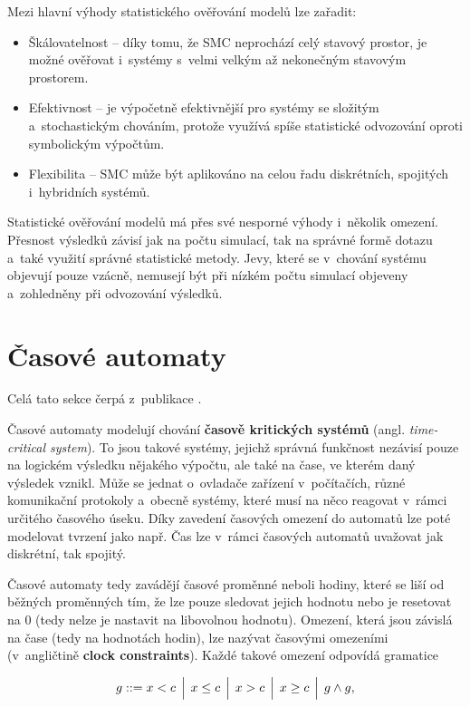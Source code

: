 Mezi hlavní výhody statistického ověřování modelů lze zařadit:
\begin{itemize}
    \item Škálovatelnost -- díky tomu, že SMC neprochází celý stavový prostor, je možné ověřovat i~systémy s~velmi velkým až nekonečným stavovým prostorem.
    \item Efektivnost -- je výpočetně efektivnější pro systémy se složitým a~stochastickým chováním, protože využívá spíše statistické odvozování oproti symbolickým výpočtům.
    \item Flexibilita -- SMC může být aplikováno na celou řadu diskrétních, spojitých i~hybridních systémů.
\end{itemize}

Statistické ověřování modelů má přes své nesporné výhody i~několik omezení. Přesnost výsledků závisí jak na počtu simulací, tak na správné formě dotazu a~také využití správné statistické metody. Jevy, které se v~chování systému objevují pouze vzácně, nemusejí být při nízkém počtu simulací objeveny a~zohledněny při odvozování výsledků.

\section{Časové automaty}
Celá tato sekce čerpá z~publikace \cite{mc_principles}. 

Časové automaty modelují chování \textbf{časově kritických systémů} (angl. \textit{time-critical system}). To jsou takové systémy, jejichž správná funkčnost nezávisí pouze na logickém výsledku nějakého výpočtu, ale také na čase, ve kterém daný výsledek vznikl. Může se jednat o~ovladače zařízení v~počítačích, různé komunikační protokoly a~obecně systémy, které musí na něco reagovat v~rámci určitého časového úseku. Díky zavedení časových omezení do automatů lze poté modelovat tvrzení jako např.  Čas lze v~rámci časových automatů uvažovat jak diskrétní, tak spojitý.

Časové automaty tedy zavádějí časové proměnné neboli hodiny, které se liší od běžných proměnných tím, že lze pouze sledovat jejich hodnotu nebo je resetovat na 0 (tedy nelze je nastavit na libovolnou hodnotu). Omezení, která jsou závislá na čase (tedy na hodnotách hodin), lze nazývat časovými omezeními (v~angličtině \textbf{clock constraints}). Každé takové omezení odpovídá gramatice

\begin{equation*}
    g ::= x < c \hspace{0.15cm} \Big| \hspace{0.15cm} x \leq c \hspace{0.15cm} \Big| \hspace{0.15cm} x > c \hspace{0.15cm} \Big| \hspace{0.15cm} x \geq c \hspace{0.15cm} \Big| \hspace{0.15cm} g \wedge g,
\end{equation*}

